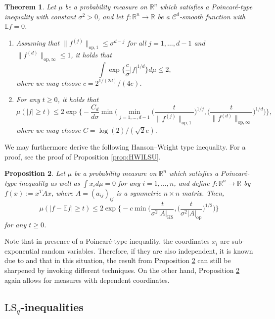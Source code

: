 \documentclass[a4paper,12pt]{amsart}
\numberwithin{equation}{section}
\newtheorem{satz}{Theorem}[section]
\newtheorem{proposition}[satz]{Proposition}
\theoremstyle{remark}
\def\E{{\mathbb E}}
\def\R{{\mathbb R}}
\begin{document}
\begin{satz}\label{thm:HigherOrderPI}
	Let $\mu$ be a probability measure on $\R^n$ which satisfies a Poincar\'{e}-type inequality with constant $\sigma^2 > 0$, and let $f\colon \R^n \to \R$ be a $\mathcal{C}^d$-smooth function with $\E f = 0$.
	\begin{enumerate}
		\item Assuming that $\lVert f^{(j)} \rVert_{\mathrm{op},1} \le \sigma^{d-j}$ for all $j=1,\ldots,d-1$ and $\lVert f^{(d)} \rVert_{\mathrm{op},\infty} \le 1$, it holds that
		\[
		\int \exp\Big\{\frac{c}{\sigma} |f|^{1/d} \Big\} d\mu \le 2,
		\]
		where we may choose $c=2^{1/(2d)}/(4e)$.
		\item For any $t\ge 0$, it holds that
		\[
		\mu(|f| \ge t)\le
		2 \exp\Big\{- \frac{C_d}{d\sigma} \min\Big(\min_{j=1, \ldots,d-1} \Big(\frac{t}{\lVert f^{(j)} \rVert_{\mathrm{op},1}}\Big)^{1/j}, \Big(\frac{t}{\lVert f^{(d)} \rVert_{\mathrm{op},\infty}}\Big)^{1/d}\Big)\Big\},
		\]
		where we may choose $C = \log(2)/(\sqrt{2}e)$.
	\end{enumerate}
\end{satz}

We may furthermore derive the following Hanson--Wright type inequality. For a proof, see the proof of Proposition \ref{prop:HWILSU}.

\begin{proposition}\label{prop:HWIPU}
    Let $\mu$ be a probability measure on $\R^n$ which satisfies a Poincar\'{e}-type inequality as well as $\int x_i d\mu = 0$ for any $i=1, \ldots,n$, and define $f\colon \R^n \to \R$ by $f(x) := x^TAx$, where $A=(a_{ij})_{ij}$ is a symmetric $n \times n$ matrix. Then,
    \[
    \mu(|f - \E f| \ge t) \le 2\exp\Big\{-c \min \Big(\frac{t}{\sigma^2\lvert A \rvert_{\mathrm{HS}}}, \Big(\frac{t}{\sigma^2\lvert A \rvert_{\mathrm{op}}}\Big)^{1/2}\Big)\Big\}
    \]
    for any $t \ge 0$.
\end{proposition}

Note that in presence of a Poincar\'{e}-type inequality, the coordinates $x_i$ are sub-exponential random variables. Therefore, if they are also independent, it is known due to \cite{KL15} and \cite{GSS21b} that in this situation, the result from Proposition \ref{prop:HWIPU} can still be sharpened by invoking different techniques. On the other hand, Proposition \ref{prop:HWIPU} again allows for measures with dependent coordinates.

\subsection{\texorpdfstring{$\mathrm{LS}_q$}{LS\_q}-inequalities}
\end{document}

